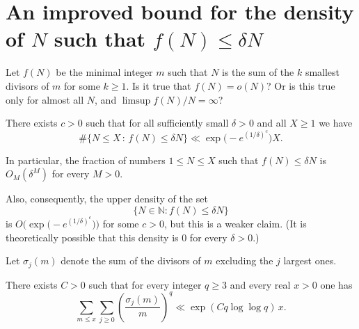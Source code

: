 \section{An improved bound for the density of $N$ such that $f(N)\leq \delta N$}

\begin{problem}
Let $f(N)$ be the minimal integer $m$ such that $N$ is the sum of the $k$ smallest divisors of $m$ for some $k\geq 1$.
Is it true that $f(N)=o(N)$? Or is this true only for almost all $N$, and $\limsup f(N)/N=\infty$?
\end{problem}

\begin{theorem}\label{thm:density}
There exists $c>0$ such that for all sufficiently small $\delta>0$ and all $X\geq1$ we have
\[ \#\{N\leq X \,:\, f(N)\leq \delta N\} \ll \exp\bigl(-e^{(1/\delta)^c}\bigr) X. \]
\end{theorem}

In particular, the fraction of numbers $1\leq N\leq X$ such that $f(N)\leq \delta N$ is $O_M(\delta^M)$ for every $M>0$. 

Also, consequently, the upper density of the set 
\[ \{N\in\mathbb{N} : f(N)\leq \delta N\} \]
is $O\bigl(\exp\bigl(-e^{(1/\delta)^c}\bigr)\bigr)$ for some $c>0$, but this is a weaker claim. (It is theoretically possible that this density is $0$ for every $\delta>0$.)

\bigskip
Let $\sigma_j(m)$ denote the sum of the divisors of $m$ excluding the $j$ largest ones.

\begin{lemma}\label{lm:moments}
There exists $C>0$ such that for every integer $q\geq 3$ and every real $x>0$ one has
\[ \sum_{m\leq x}\sum_{j\geq 0} \left(\frac{\sigma_j(m)}{m}\right)^q \ll \exp(C q \log\log q) \,x. \]
\end{lemma}

